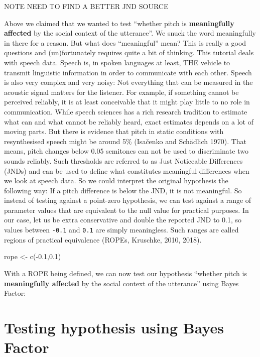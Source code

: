 \documentclass[
  doc,
  longtable,
  nolmodern,
  notxfonts,
  notimes,
  colorlinks=true,linkcolor=blue,citecolor=blue,urlcolor=blue]{apa7}
\newenvironment{Shaded}{\begin{snugshade}}{\end{snugshade}}
\newcommand{\FloatTok}[1]{\textcolor[rgb]{0.68,0.00,0.00}{#1}}
\newcommand{\FunctionTok}[1]{\textcolor[rgb]{0.28,0.35,0.67}{#1}}
\newcommand{\NormalTok}[1]{\textcolor[rgb]{0.00,0.23,0.31}{#1}}
\newcommand{\OtherTok}[1]{\textcolor[rgb]{0.00,0.23,0.31}{#1}}
\newcommand{\SpecialCharTok}[1]{\textcolor[rgb]{0.37,0.37,0.37}{#1}}
\begin{document}
NOTE NEED TO FIND A BETTER JND SOURCE

Above we claimed that we wanted to test ``whether pitch is
\textbf{meaningfully affected} by the social context of the utterance''.
We snuck the word meaningfully in there for a reason. But what does
``meaningful'' mean? This is really a good questions and (un)fortunately
requires quite a bit of thinking. This tutorial deals with speech data.
Speech is, in spoken languages at least, THE vehicle to transmit
linguistic information in order to communicate with each other. Speech
is also very complex and very noisy: Not everything that can be measured
in the acoustic signal matters for the listener. For example, if
something cannot be perceived reliably, it is at least conceivable that
it might play little to no role in communication. While speech sciences
has a rich research tradition to estimate what can and what cannot be
reliably heard, exact estimates depends on a lot of moving parts. But
there is evidence that pitch in static conditions with resynthesised
speech might be around 5\% (Isačenko and Schädlich 1970). That means,
pitch changes below 0.05 semitones can not be used to discriminate two
sounds reliably. Such thresholds are referred to as Just Noticeable
Differences (JNDs) and can be used to define what constitutes meaningful
differences when we look at speech data. So we could interpret the
original hypothesis the following way: If a pitch difference is below
the JND, it is not meaningful. So instead of testing against a
point-zero hypothesis, we can test against a range of parameter values
that are equivalent to the null value for practical purposes. In our
case, let us be extra conservative and double the reported JND to 0.1,
so values between \texttt{-0.1} and \texttt{0.1} are simply meaningless.
Such ranges are called regions of practical equivalence (ROPEs,
Kruschke, 2010, 2018).

\begin{Shaded}
\begin{Highlighting}[]
\NormalTok{rope }\OtherTok{\textless{}{-}} \FunctionTok{c}\NormalTok{(}\SpecialCharTok{{-}}\FloatTok{0.1}\NormalTok{,}\FloatTok{0.1}\NormalTok{)}
\end{Highlighting}
\end{Shaded}

With a ROPE being defined, we can now test our hypothesis ``whether
pitch is \textbf{meaningfully affected} by the social context of the
utterance'' using Bayes Factor:

\section{Testing hypothesis using Bayes
Factor}\label{testing-hypothesis-using-bayes-factor}
\end{document}
